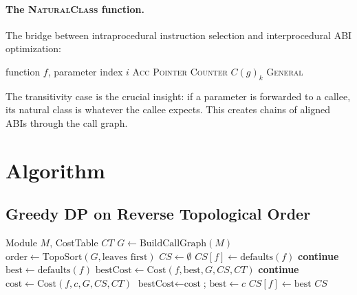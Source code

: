 \documentclass[sigplan,screen,nonacm]{acmart}
\begin{document}
\paragraph{The \textsc{NaturalClass} function.}
The bridge between intraprocedural instruction selection and interprocedural
ABI optimization:

\begin{algorithmic}[1]
\REQUIRE function $f$, parameter index $i$
    \RETURN \textsc{Acc}
    \RETURN \textsc{Pointer}
    \RETURN \textsc{Counter}
    \RETURN $C(g)_k$ 
  \ENDIF
\ENDFOR
\RETURN \textsc{General}
\end{algorithmic}

The transitivity case is the crucial insight: if a parameter is forwarded to
a callee, its natural class is whatever the callee expects.  This creates
chains of aligned ABIs through the call graph.

\section{Algorithm}
\label{sec:algorithm}

\subsection{Greedy DP on Reverse Topological Order}

\begin{algorithm}[t]
\caption{PFCCO-Optimize}
\label{alg:pfcco}
\begin{algorithmic}[1]
\REQUIRE Module $M$, CostTable $CT$
\STATE $G \gets \text{BuildCallGraph}(M)$
\STATE $\text{order} \gets \text{TopoSort}(G, \text{leaves first})$
\STATE $\mathit{CS} \gets \emptyset$
    \STATE $\mathit{CS}[f] \gets \text{defaults}(f)$
    \STATE \textbf{continue}
  \ENDIF
  \STATE $\text{best} \gets \text{defaults}(f)$
  \STATE $\text{bestCost} \gets \text{Cost}(f, \text{best}, G, \mathit{CS}, CT)$
      \STATE \textbf{continue}
    \ENDIF
    \STATE $\text{cost} \gets \text{Cost}(f, c, G, \mathit{CS}, CT)$
      \STATE $\text{bestCost} \gets \text{cost}$; $\text{best} \gets c$
    \ENDIF
  \ENDFOR
  \STATE $\mathit{CS}[f] \gets \text{best}$
\ENDFOR
\RETURN $\mathit{CS}$
\end{algorithmic}
\end{algorithm}
\end{document}
